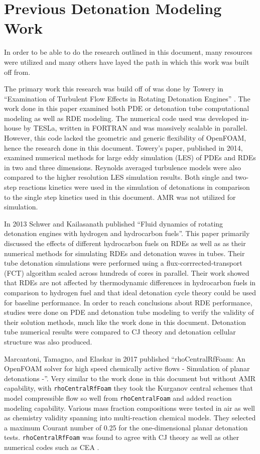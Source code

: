\section{Previous Detonation Modeling Work}
In order to be able to do the research outlined in this document, many resources were utilized and many others have layed the path in which this work was built off from. 

The primary work this research was build off of was done by Towery in ``Examination of Turbulent Flow Effects in Rotating Detonation Engines'' \cite{towery1}. The work done in this paper examined both PDE or detonation tube computational modeling as well as RDE modeling. The numerical code used was developed in-house by TESLa, written in FORTRAN and was massively scalable in parallel. However, this code lacked the geometric and generic flexibility of OpenFOAM, hence the research done in this document. Towery's paper, published in 2014, examined numerical methods for large eddy simulation (LES) of PDEs and RDEs in two and three dimensions. Reynolds averaged turbulence models were also compared to the higher resolution LES simulation results. Both single and two-step reactions kinetics were used in the simulation of detonations in comparison to the single step kinetics used in this document. AMR was not utilized for simulation. 

In 2013 Schwer and Kailasanath published ``Fluid dynamics of rotating detonation engines with hydrogen and hydrocarbon fuels''\cite{schwer1}. This paper primarily discussed the effects of different hydrocarbon fuels on RDEs as well as as their numerical methods for simulating RDEs and detonation waves in tubes. Their tube detonation simulations were performed using a flux-corrrected-transport (FCT) algorithm scaled across hundreds of cores in parallel. Their work showed that RDEs are not affected by thermodynamic differences in hydrocarbon fuels in comparison to hydrogen fuel and that ideal detonation cycle theory could be used for baseline performance. In order to reach conclusions about RDE performance, studies were done on PDE and detonation tube modeling to verify the validity of their solution methods, much like the work done in this document. Detonation tube numerical results were compared to CJ theory and detonation cellular structure was also produced. 

Marcantoni, Tamagno, and Elaskar in 2017 published ``rhoCentralRfFoam: An OpenFOAM solver for high speed chemically active flows - Simulation of planar detonations -''\cite{marcantoni}. Very similar to the work done in this document but without AMR capability, with \verb|rhoCentralRfFoam| they took the Kurganov central schemes that model compressible flow so well from \verb|rhoCentralFoam| and added reaction modeling capability. Various mass fraction compositions were tested in air as well as chemistry validity spanning into multi-reaction chemical models. They selected a maximum Courant number of 0.25 for the one-dimensional planar detonation tests. \verb|rhoCentralRfFoam| was found to agree with CJ theory as well as other numerical codes such as CEA \cite{CEA}. 

